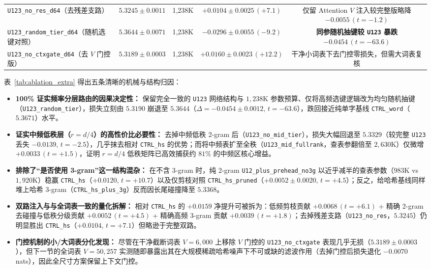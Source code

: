 \documentclass[10.5pt,a4paper]{ctexart}
\begin{document}
\begin{table}[htbp]
{\begin{tabular}{lcccc}
\texttt{U123\_no\_res\_d64}（去残差支路） & $5.3245 \pm 0.0011$ & 1,238K & $+0.0104 \pm 0.0025\,(+7.1)$ & 仅留 Attention $V$ 注入较完整版略降 $-0.0055\,(t=-1.2)$ \\
\texttt{U123\_random\_tier\_d64}（随机选键对照） & $5.3644 \pm 0.0071$ & 1,238K & $-0.0296 \pm 0.0055\,(-9.2)$ & \textbf{同参随机抽键较 \texttt{U123} 暴跌 $-0.0454\,(t=-63.6)$} \\
\texttt{U123\_no\_ctxgate\_d64}（去 $V$ 门控版） & $\mathbf{5.3189 \pm 0.0003}$ & 1,238K & $\mathbf{+0.0160 \pm 0.0023\,(+12.2)}$ & 干净小词表下去门控零损失，但需大词表复核 \\
\bottomrule
\end{tabular}%
}
\end{table}

表~\ref{tab:ablation_extra} 得出五条清晰的机械与结构归因：
\begin{itemize}
    \item \textbf{100\% 证实频率分层路由的因果决定性：} 保留完全一致的 \texttt{U123} 网络结构与 $1{,}238\text{K}$ 参数预算、仅将高频选键逻辑改为均匀随机抽键（\texttt{U123\_random\_tier}），损失立刻由 $5.3190$ 崩退至 $5.3644$（\textbf{$\Delta = -0.0454 \pm 0.0012, \, t = -63.6$}），跌回接近纯单字基线 \texttt{CTRL\_word}（$5.3671$）水平。
    \item \textbf{证实中频低秩层（$r=d/4$）的高性价比必要性：} 去掉中频低秩 2-gram 后（\texttt{U123\_no\_mid\_tier}），损失大幅回退至 $5.3329$（较完整 \texttt{U123} 丢失 $-0.0139, \, t=-2.5$），几乎抹去相对 \texttt{CTRL\_hs} 的优势；而将中频表扩至全秩（\texttt{U123\_mid\_fullrank}，查表参翻倍至 $2{,}630\text{K}$）仅微增 $+0.0033\,(t=+1.5)$，证明 $r=d/4$ 低秩矩阵已高效捕获约 $81\%$ 的中频区核心增益。
    \item \textbf{排除了“是否使用 3-gram”这一结构混杂：} 在不含 3-gram 时，纯 2-gram \texttt{U12\_plus\_prehead\_no3g} 以近乎减半的查表参数（$983\text{K}$ vs $1{,}920\text{K}$）稳赢 \texttt{CTRL\_hs}（$+0.0120, \, t=+10.7$）以及仅剪枝对照 \texttt{CTRL\_hs\_pruned}（$+0.0052 \pm 0.0020, \, t=+4.5$）；反之，给哈希基线同样堆上哈希 3-gram（\texttt{CTRL\_hs\_plus\_3g}）反而因长尾碰撞降至 $5.3368$。
    \item \textbf{双路注入与与全词表一致的量化拆解：} 相对 \texttt{CTRL\_hs} 的 $+0.0159$ 净提升可被拆为：低频剪枝贡献 $+0.0068\,(t=+6.1)$ + 精确 2-gram 去碰撞与低秩分级贡献 $+0.0052\,(t=+4.5)$ + 精确高频 3-gram 贡献 $+0.0039\,(t=+1.8)$；去掉残差支路（\texttt{U123\_no\_res}，$5.3245$）仍明显胜出 \texttt{CTRL\_hs}（$+0.0104, \, t=+7.1$）但略逊于完整双路。
    \item \textbf{门控机制的小/大词表分化发现：} 尽管在干净截断词表 $V=6{,}000$ 上移除 $V$ 门控的 \texttt{U123\_no\_ctxgate} 表现几乎无损（$5.3189 \pm 0.0003$），但下一节的全词表 $V=50{,}257$ 实测随即暴露出其在大规模稀疏哈希噪声下不可或缺的滤波作用（去掉门控后损失退化 $-0.0070$ nats），因此全尺寸方案保留上下文门控。
\end{itemize}
\end{document}
